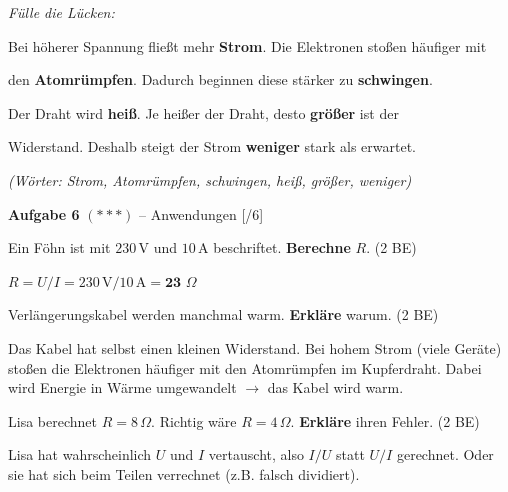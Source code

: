 \documentclass[11pt, a4paper]{article}
\newcommand{\loes}[1]{\textcolor{loesung}{\textbf{#1}}}
\newcommand{\punktebox}[1]{\hfill\small\textcolor{mittelgrau}{[\hspace{0.8em}/#1]}}
\newcommand{\aufgabe}[2]{%
    \needspace{4\baselineskip}%
    \vspace{8pt}%
    \noindent\textbf{\textcolor{fachfarbe}{Aufgabe #1}} #2%
    \vspace{4pt}%
    \nopagebreak[4]%
}
\newcommand{\operator}[1]{\textbf{#1}}
\begin{document}
\begin{teil}
    \vspace{0.3em}
    \textit{Fülle die Lücken:}

    \vspace{0.4em}
    Bei höherer Spannung fließt mehr \loes{Strom}. Die Elektronen stoßen häufiger mit

    \vspace{0.3em}
    den \loes{Atomrümpfen}. Dadurch beginnen diese stärker zu \loes{schwingen}.

    \vspace{0.3em}
    Der Draht wird \loes{heiß}. Je heißer der Draht, desto \loes{größer} ist der

    \vspace{0.3em}
    Widerstand. Deshalb steigt der Strom \loes{weniger} stark als erwartet.

    \vspace{0.4em}
    \hfill\textit{\small (Wörter: Strom, Atomrümpfen, schwingen, heiß, größer, weniger)}
\end{teil}


\aufgabe{6}{$(***)$ – Anwendungen} \punktebox{6}

\begin{teil}
    \item Ein Föhn ist mit $230\,\text{V}$ und $10\,\text{A}$ beschriftet. \operator{Berechne} $R$. \hfill (2 BE)

    \textcolor{loesung}{$R = U / I = 230\,\text{V} / 10\,\text{A} = \textbf{23 $\Omega$}$}

    \vspace{0.3em}
    \item Verlängerungskabel werden manchmal warm. \operator{Erkläre} warum. \hfill (2 BE)

    \textcolor{loesung}{Das Kabel hat selbst einen kleinen Widerstand. Bei hohem Strom (viele Geräte) stoßen die Elektronen häufiger mit den Atomrümpfen im Kupferdraht. Dabei wird Energie in Wärme umgewandelt $\rightarrow$ das Kabel wird warm.}

    \vspace{0.3em}
    \item Lisa berechnet $R = 8\,\Omega$. Richtig wäre $R = 4\,\Omega$. \operator{Erkläre} ihren Fehler. \hfill (2 BE)

    \textcolor{loesung}{Lisa hat wahrscheinlich $U$ und $I$ vertauscht, also $I/U$ statt $U/I$ gerechnet. Oder sie hat sich beim Teilen verrechnet (z.B. falsch dividiert).}
\end{teil}
\end{document}
